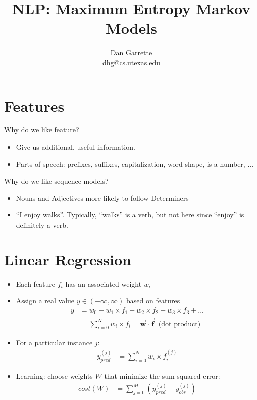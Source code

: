 \documentclass[11pt,letterpaper]{article}
\title{NLP: Maximum Entropy Markov Models}
\author{Dan Garrette\\\small{dhg@cs.utexas.edu}}
\newcommand{\vv}[1]{\ensuremath{\vec{\mathbf{#1}}}}
\begin{document}
\maketitle



\section{Features}

Why do we like feature?

\begin{itemize}
  \item Give us additional, useful information.
  \item Parts of speech: prefixes, suffixes, capitalization, word shape, is a number, ...
\end{itemize}

Why do we like sequence models?

\begin{itemize}
  \item Nouns and Adjectives more likely to follow Determiners
  \item ``I enjoy walks''.  Typically, ``walks'' is a verb, but not here since ``enjoy'' is definitely a verb.
\end{itemize}



\section{Linear Regression}

\begin{itemize}
  \item Each feature $f_i$ has an associated weight $w_i$
  \item Assign a real value $y \in (-\infty,\infty)$ based on features
    \begin{align*} 
      y &= w_0 + w_1 \times f_1 + w_2 \times f_2 + w_3 \times f_3 + ...\\
        &= \sum_{i=0}^N w_i \times f_i  = \vv{w} \cdot \vv{f} ~~ \text{(dot product)}
     \end{align*}
  \item For a particular instance $j$: \vspace{-5mm}
    \begin{align*} 
      y_{\textit{pred}}^{(j)} &= \sum_{i=0}^N w_i \times f_i^{(j)}
     \end{align*}
  \item Learning: choose weights $W$ that minimize the sum-squared error:
    \begin{align*} 
      cost(W) &= \sum_{j=0}^M (y_{\textit{pred}}^{(j)}-y_{\textit{obs}}^{(j)})
     \end{align*}
\end{itemize}
\end{document}
